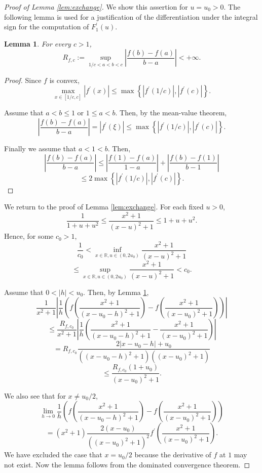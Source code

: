 \documentclass[journal]{IEEEtran}
\newtheorem{lemma}[theorem]{Lemma}
\begin{document}
\begin{proof}[Proof of Lemma \ref{lem:exchange}]
We show this assertion for $u = u_0 > 0$. 
The following lemma is used for a justification of the differentiation under the integral sign for the computation of $F_1^{\prime}(u)$. 
\begin{lemma}\label{lem:meanvalue}
For every $c > 1$, 
\[ R_{f,c} := \sup_{1/c < a < b < c} \left|\frac{f(b) - f(a)}{b-a}\right| < +\infty. \]
\end{lemma}

\begin{proof}
Since $f$ is convex, 
\[ \max_{x \in [1/c, c]} |f^{\prime}(x)| \le \max\left\{|f^{\prime}(1/c)|, |f^{\prime}(c)| \right\}.  \]

Assume that $a < b \le 1$ or $1 \le a < b$. 
Then, by the mean-value theorem, 
\[  \left|\frac{f(b) - f(a)}{b-a}\right| = |f^{\prime}(\xi)| \le \max\left\{|f^{\prime}(1/c)|, |f^{\prime}(c)| \right\}. \]

Finally we assume that $a < 1 < b$. 
Then, 
\[ \left|\frac{f(b) - f(a)}{b-a}\right| \le \left|\frac{f(1) - f(a)}{1-a}\right| + \left|\frac{f(b) - f(1)}{b-1}\right| \]
\[\le 2 \max\left\{|f^{\prime}(1/c)|, |f^{\prime}(c)| \right\}.  \]
\end{proof}

We return to the proof of Lemma \ref{lem:exchange}. 
For each fixed $u > 0$, 
\[ \frac{1}{1 + u + u^2} \le \frac{x^2+ 1}{(x-u)^2 + 1} \le 1 + u + u^2. \]
Hence, for some $c_0 > 1$, 
\[ \frac{1}{c_0} < \inf_{x \in \mathbb R, u \in  \left(0, 2u_0\right)} \frac{x^2+ 1}{(x-u)^2 + 1} \]
\[\le \sup_{x \in \mathbb R, u \in  \left(0, 2u_0\right)} \frac{x^2+ 1}{(x-u)^2 + 1} < c_0. \] 

Assume that $0 < |h| < u_0$. 
Then, by Lemma \ref{lem:meanvalue}, 
\[ \frac{1}{x^2 + 1} \left| \frac{1}{h} \left( f \left(  \frac{x^2+ 1}{(x-u_0 -h)^2 + 1}\right) - f \left(  \frac{x^2+ 1}{(x-u_0)^2 + 1}\right)\right) \right|\]
\[  \le \frac{R_{f, c_0}}{x^2 + 1} \left| \frac{1}{h} \left(\frac{x^2+ 1}{(x-u_0-h)^2 + 1} - \frac{x^2+ 1}{(x-u_0)^2 + 1}\right) \right| \]
\[= R_{f, c_0} \frac{2|x-u_0 -h| + u_0}{((x-u_0-h)^2 + 1)((x-u_0)^2 + 1)} \]
\[\le  \frac{R_{f, c_0}(1+  u_0)}{(x-u_0)^2 + 1}. \] 

We also see that for $x \ne u_0/2$, 
\[  \lim_{h \to 0} \frac{1}{h} \left( f \left(  \frac{x^2+ 1}{(x-u_0 -h)^2 + 1}\right) - f \left(  \frac{x^2+ 1}{(x-u_0)^2 + 1}\right)\right)\]
\[  = (x^2 + 1) \frac{2(x-u_0)}{((x-u_0)^2 + 1)^2} f^{\prime} \left(  \frac{x^2+ 1}{(x-u_0)^2 + 1}\right).  \]
We have excluded the case that $x = u_0/2$ because the derivative of $f$ at $1$ may not exist. 
Now the lemma follows from the dominated convergence theorem.
\end{proof}
\end{document}
